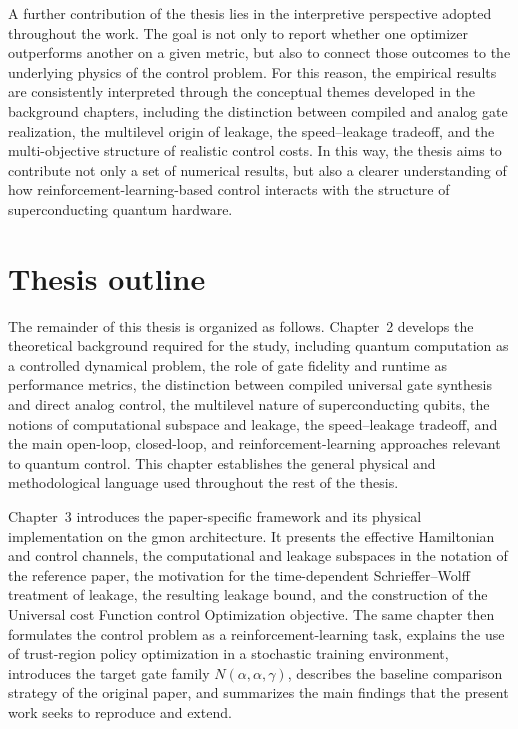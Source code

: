 A further contribution of the thesis lies in the interpretive perspective adopted throughout the work. The goal is not only to report whether one optimizer outperforms another on a given metric, but also to connect those outcomes to the underlying physics of the control problem. For this reason, the empirical results are consistently interpreted through the conceptual themes developed in the background chapters, including the distinction between compiled and analog gate realization, the multilevel origin of leakage, the speed--leakage tradeoff, and the multi-objective structure of realistic control costs. In this way, the thesis aims to contribute not only a set of numerical results, but also a clearer understanding of how reinforcement-learning-based control interacts with the structure of superconducting quantum hardware.

\section{Thesis outline}
\label{subsec:intro_thesis_outline}

The remainder of this thesis is organized as follows. Chapter~2 develops the theoretical background required for the study, including quantum computation as a controlled dynamical problem, the role of gate fidelity and runtime as performance metrics, the distinction between compiled universal gate synthesis and direct analog control, the multilevel nature of superconducting qubits, the notions of computational subspace and leakage, the speed--leakage tradeoff, and the main open-loop, closed-loop, and reinforcement-learning approaches relevant to quantum control. This chapter establishes the general physical and methodological language used throughout the rest of the thesis.

Chapter~3 introduces the paper-specific framework and its physical implementation on the gmon architecture. It presents the effective Hamiltonian and control channels, the computational and leakage subspaces in the notation of the reference paper, the motivation for the time-dependent Schrieffer--Wolff treatment of leakage, the resulting leakage bound, and the construction of the Universal cost Function control Optimization objective. The same chapter then formulates the control problem as a reinforcement-learning task, explains the use of trust-region policy optimization in a stochastic training environment, introduces the target gate family \(N(\alpha,\alpha,\gamma)\), describes the baseline comparison strategy of the original paper, and summarizes the main findings that the present work seeks to reproduce and extend.

